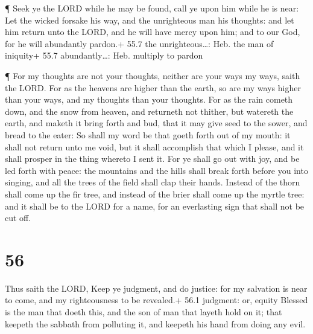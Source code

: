  ¶ Seek ye the LORD while he may be found, call ye upon him
while he is near:  Let the wicked forsake his way, and the
unrighteous man his thoughts: and let him return unto the LORD, and he
will have mercy upon him; and to our God, for he will abundantly
pardon.+ 55.7 the unrighteous\ldots: Heb. the man of iniquity+ 55.7
abundantly\ldots: Heb. multiply to pardon

 ¶ For my thoughts are not your thoughts, neither are your
ways my ways, saith the LORD.  For as the heavens are higher
than the earth, so are my ways higher than your ways, and my thoughts
than your thoughts.  For as the rain cometh down, and the
snow from heaven, and returneth not thither, but watereth the earth, and
maketh it bring forth and bud, that it may give seed to the sower, and
bread to the eater:  So shall my word be that goeth forth
out of my mouth: it shall not return unto me void, but it shall
accomplish that which I please, and it shall prosper in the thing
whereto I sent it.  For ye shall go out with joy, and be
led forth with peace: the mountains and the hills shall break forth
before you into singing, and all the trees of the field shall clap their
hands.  Instead of the thorn shall come up the fir tree,
and instead of the brier shall come up the myrtle tree: and it shall be
to the LORD for a name, for an everlasting sign that shall not be cut
off.

\hypertarget{section-55}{%
\section{56}\label{section-55}}

 Thus saith the LORD, Keep ye judgment, and do justice: for
my salvation is near to come, and my righteousness to be revealed.+ 56.1
judgment: or, equity  Blessed is the man that doeth this,
and the son of man that layeth hold on it; that keepeth the sabbath from
polluting it, and keepeth his hand from doing any evil.

